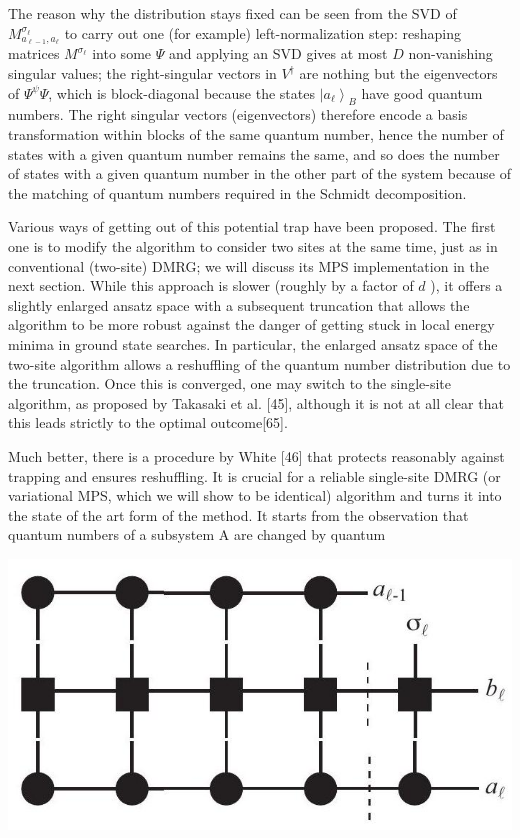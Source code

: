 \documentclass[12pt]{article}
\begin{document}
The reason why the distribution stays fixed can be seen from the SVD of $M_{a_{\ell-1}, a_{\ell}}^{\sigma_{\ell}}$ to carry out one (for example) left-normalization step: reshaping matrices $M^{\sigma_{\ell}}$ into some $\Psi$ and applying an SVD gives at most $D$ non-vanishing singular values; the right-singular vectors in $V^{\dagger}$ are nothing but the eigenvectors of $\Psi^{\psi} \Psi$, which is block-diagonal because the states $\left|a_{\ell}\right\rangle_{B}$ have good quantum numbers. The right singular vectors (eigenvectors) therefore encode a basis transformation within blocks of the same quantum number, hence the number of states with a given quantum number remains the same, and so does the number of states with a given quantum number in the other part of the system because of the matching of quantum numbers required in the Schmidt decomposition.

Various ways of getting out of this potential trap have been proposed. The first one is to modify the algorithm to consider two sites at the same time, just as in conventional (two-site) DMRG; we will discuss its MPS implementation in the next section. While this approach is slower (roughly by a factor of $d$ ), it offers a slightly enlarged ansatz space with a subsequent truncation that allows the algorithm to be more robust against the danger of getting stuck in local energy minima in ground state searches. In particular, the enlarged ansatz space of the two-site algorithm allows a reshuffling of the quantum number distribution due to the truncation. Once this is converged, one may switch to the single-site algorithm, as proposed by Takasaki et al. [45], although it is not at all clear that this leads strictly to the optimal outcome[65].

Much better, there is a procedure by White [46] that protects reasonably against trapping and ensures reshuffling. It is crucial for a reliable single-site DMRG (or variational MPS, which we will show to be identical) algorithm and turns it into the state of the art form of the method. It starts from the observation that quantum numbers of a subsystem A are changed by quantum

\begin{center}
\includegraphics[max width=\textwidth]{2024_05_04_afc4ad226da9ccfe0ac8g-070}
\end{center}
\end{document}
